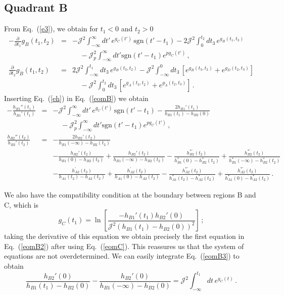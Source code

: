 \documentclass[prx,aps,onecolumn,amsfonts,showpacs,superscriptaddress,preprint,eqsecnum]
{revtex4-1}
\newcommand{\beq}{\begin{equation}}
\newcommand{\eeq}{\end{equation}}
\def\bea{\begin{eqnarray}}
\def\eea{\end{eqnarray}}
\newcommand{\nn}{\nonumber \\}
\begin{document}
\subsection{Quadrant B}

From Eq.~(\ref{e3}), we obtain for $t_1 < 0$ and $t_2 > 0$
\bea
-\frac{\partial}{\partial t_1} g_B (t_1,t_2) &=&   -\mathcal{J}^2 \int_{-\infty}^{\infty} dt' \,   e^{g_C (t')} \,  \mbox{sgn} (t'-t_1)
 - 2  \mathcal{J}^2 \int_{0}^{t_2} dt_3  \,  e^{g_B (t_1,t_3)}  \nn
 &~&~~~~~ - \mathcal{J}_p^2 \int_{-\infty}^{\infty} dt' \mbox{sgn}(t'-t_1) e^{p g_C (t')} \, ,\nn
  \frac{\partial}{ \partial t_2} g_B (t_1,t_2) &=& 2\mathcal{J}^2   \int_{-\infty}^{t_1} dt_3  \, e^{g_B (t_3,t_2)} 
-  \mathcal{J}^2  \int_{-\infty}^{0} dt_3  \,  \left[ e^{g_B (t_3,t_2)} + e^{g_D (t_2,t_3)} \right] \nn &~&~~~~~
-  \mathcal{J}^2  \int_{0}^{t_2} dt_3  \,  \left[ e^{g_A (t_3,t_2)} + e^{g_{\widetilde{A}} (t_2,t_3)} \right]\,. \label{eomB}
\eea
Inserting Eq.~(\ref{eh}) in Eq.~(\ref{eomB}) we obtain
\bea
- \frac{h_{B1}'' (t_1)}{h_{B1}' (t_1)} &=&  -\mathcal{J}^2 \int_{-\infty}^{\infty} dt' \,   e^{g_C (t')} \,  \mbox{sgn} (t'-t_1) - \frac{2 h_{B1}' (t_1)}{h_{B1} (t_1) - h_{B2} (0)}  \nn
 &~&~~~~~ - \mathcal{J}_p^2 \int_{-\infty}^{\infty} dt' \mbox{sgn}(t'-t_1) e^{p g_C (t')} \,, \label{eomB2} \\
\frac{h_{B2}'' (t_2)}{h_{B2}' (t_2)} &=&  - \frac{2 h_{B2}' (t_2)}{h_{B1} (-\infty) - h_{B2} (t_2)} \label{eomB3a}
\\ &~&
- \frac{h_{B2}' (t_2)}{h_{B1} (0) - h_{B2} (t_2)}
+ \frac{h_{B2}' (t_2)}{h_{B1} (-\infty) - h_{B2} (t_2)}
- \frac{h_{B2}^{\ast\prime} (t_2)}{h_{B1}^\ast (0) - h_{B2}^\ast (t_2)}
+ \frac{h_{B2}^{\ast\prime} (t_2)}{h_{B1}^\ast (-\infty) - h_{B2}^\ast (t_2)} \nn
&~& - \frac{h_{A2}^{\prime} (t_2)}{h_{A1} (t_2) - h_{A2} (t_2)}
+ \frac{h_{A2}^{\prime} (t_2)}{h_{A1} (0) - h_{A2} (t_2)}
- \frac{h_{A2}^{\ast\prime} (t_2)}{h_{A1}^\ast (t_2) - h_{A2}^\ast (t_2)}
+ \frac{h_{A2}^{\ast\prime} (t_2)}{h_{A1}^\ast (0) - h_{A2}^\ast (t_2)} \,.
\nonumber
\eea

We also have the compatibility condition at the boundary between regions B and C, which is
\beq
g_C (t_1) = \ln \left[ \frac{-h_{B 1}' (t_1) h_{B 2}' (0)}{\mathcal{J}^2 (h_{B 1} (t_1) - h_{B 2} (0))^2} \right] \,; \label{eomB3}
\eeq
taking the derivative of this equation we obtain precisely the first equation in Eq.~(\ref{eomB2}) after using Eq.~(\ref{eomC}). 
This reassures us that the system of equations are not overdetermined. We can easily integrate Eq.~(\ref{eomB3}) to obtain
\beq
\frac{h_{B2}' (0)}{h_{B1} (t_1) - h_{B2} (0)} - \frac{h_{B2}' (0)}{h_{B1} (-\infty) - h_{B2} (0)} = 
\mathcal{J}^2 \int_{-\infty}^{t_1} dt \, e^{g_C (t)} \,. \label{exact4}
\eeq
\end{document}

